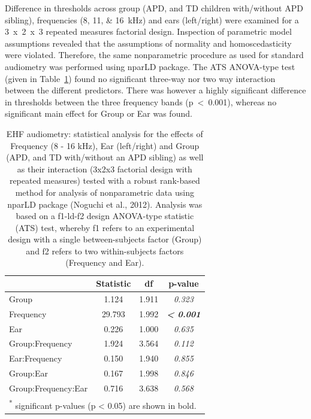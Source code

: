 \documentclass[a4paper, twoside]{templates/ociamthesis}
\begin{document}
Difference in thresholds across group (APD, and TD children with/without APD sibling), frequencies (8, 11, \& 16~kHz) and ears (left/right) were examined for a 3~x~2~x~3 repeated measures factorial design. Inspection of parametric model assumptions revealed that the assumptions of normality and homoscedasticity were violated. Therefore, the same nonparametric procedure as used for standard audiometry was performed using nparLD package. The ATS ANOVA-type test (given in Table~\ref{tab:EHF-TabnparLD}) found no significant three-way nor two way interaction between the different predictors. There was however a highly significant difference in thresholds between the three frequency bands (p~\textless~0.001), whereas no significant main effect for Group or Ear was found.\\

\begin{table}

\caption{\label{tab:EHF-TabnparLD}EHF audiometry: statistical analysis for the effects of Frequency (8 - 16 kHz), Ear (left/right) and Group (APD, and TD with/without an APD sibling) as well as their interaction (3x2x3 factorial design with repeated measures) tested with a robust rank-based method for analysis of nonparametric data using nparLD package (Noguchi et al., 2012). Analysis was based on a f1-ld-f2 design ANOVA-type statistic (ATS) test, whereby f1 refers to an experimental design with a single between-subjects factor (Group) and f2 refers to two within-subjects factors (Frequency and Ear).}
\centering
\begin{tabular}[t]{lcc>{}c}
\toprule
  & Statistic & df & p-value\\
\midrule
Group & 1.124 & 1.911 & \em{0.323}\\
Frequency & 29.793 & 1.992 & \em{\textbf{< 0.001}}\\
Ear & 0.226 & 1.000 & \em{0.635}\\
Group:Frequency & 1.924 & 3.564 & \em{0.112}\\
Ear:Frequency & 0.150 & 1.940 & \em{0.855}\\
Group:Ear & 0.167 & 1.998 & \em{0.846}\\
Group:Frequency:Ear & 0.716 & 3.638 & \em{0.568}\\
\bottomrule
\multicolumn{4}{l}{\textsuperscript{*} significant p-values (p < 0.05) are shown in bold.}\\
\end{tabular}
\end{table}
\end{document}
